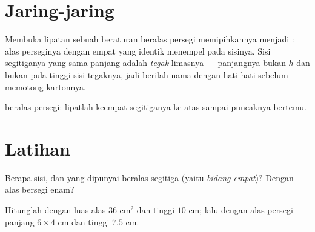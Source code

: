 \section{Jaring-jaring}

\begin{example}\label{ex:g8:solids:net}
Membuka lipatan sebuah  beraturan beralas persegi memipihkannya
menjadi \emph{}: alas perseginya dengan empat  yang identik menempel pada sisinya. Sisi segitiganya yang sama
panjang adalah \emph{ tegak} limasnya --- panjangnya bukan $h$
dan bukan pula tinggi sisi tegaknya, jadi berilah nama dengan hati-hati
sebelum memotong kartonnya.
\end{example}

\begin{omfigure}

{\small {}  beralas persegi: lipatlah keempat
segitiganya ke atas sampai puncaknya bertemu.}
\end{omfigure}

\section{Latihan}

\begin{exercise}[$\star$]\label{exo:g8:solids:1}
Berapa sisi,  dan  yang dipunyai  beralas
segitiga (yaitu \emph{bidang empat})? Dengan alas bersegi enam?
\end{exercise}

\begin{exercise}[$\star$]\label{exo:g8:solids:2}
Hitunglah   dengan luas alas $36$ cm$^2$ dan tinggi
$10$ cm; lalu   dengan alas persegi panjang
$6 \times 4$ cm dan tinggi $7.5$ cm.
\end{exercise}

